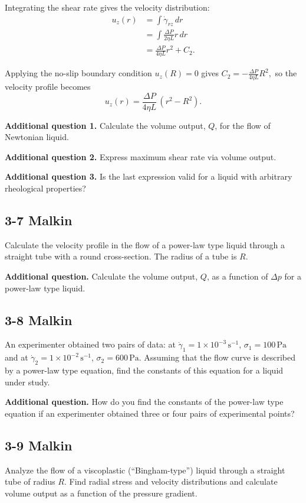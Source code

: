 Integrating the shear rate gives the velocity distribution:
\begin{align*}
	u_z(r)
	&=
	\int \dot\gamma_{rz}\,dr \\
	&=
	\int \frac{\Delta P}{2\eta L} r\,dr \\
	&=
	\frac{\Delta P}{4\eta L} r^2 + C_2.
\end{align*}

Applying the no-slip boundary condition $u_z(R) = 0$ gives
$C_2 = -\frac{\Delta P}{4\eta L} R^2,$
so the velocity profile becomes
\[
	\boxed{
	u_z(r) =
	\frac{\Delta P}{4\eta L}\,(r^2 - R^2)
	}.
\]

\textbf{Additional question 1.} Calculate the volume output, $Q$, for the flow of Newtonian liquid.

\textbf{Additional question 2.} Express maximum shear rate via volume output.

\textbf{Additional question 3.} Is the last expression valid for a liquid with arbitrary rheological properties?

\subsection{3-7 Malkin}
Calculate the velocity profile in the flow of a power-law type liquid through a straight tube with a round cross-section. The radius of a tube is $R$.

\textbf{Additional question.} Calculate the volume output, $Q$, as a function of $\Delta p$ for a power-law type liquid.

\subsection{3-8 Malkin}
An experimenter obtained two pairs of data: at $\dot{\gamma}_1 = 1\times10^{-3}\,\mathrm{s}^{-1}$, $\sigma_1 = 100\,\mathrm{Pa}$ and at $\dot{\gamma}_2 = 1\times10^{-2}\,\mathrm{s}^{-1}$, $\sigma_2 = 600\,\mathrm{Pa}$. Assuming that the flow curve is described by a power-law type equation, find the constants of this equation for a liquid under study.

\textbf{Additional question.} How do you find the constants of the power-law type equation if an experimenter obtained three or four pairs of experimental points?

\subsection{3-9 Malkin}
Analyze the flow of a viscoplastic (``Bingham-type'') liquid through a straight tube of radius $R$. Find radial stress and velocity distributions and calculate volume output as a function of the pressure gradient.

